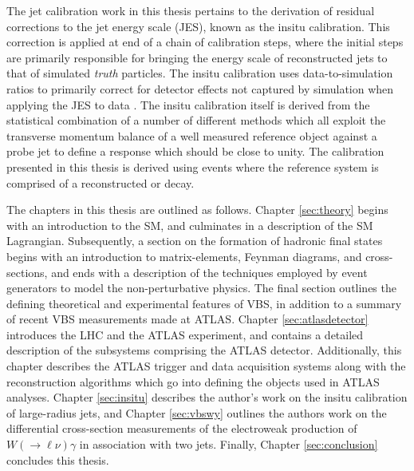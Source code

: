 The jet calibration work in this thesis pertains to the derivation of residual corrections to the jet energy scale (JES), known as the insitu calibration. This correction is applied at end of a chain of calibration steps, where the initial steps are primarily responsible for bringing the energy scale of reconstructed jets to that of simulated \textit{truth} particles. The insitu calibration uses data-to-simulation ratios to primarily correct for detector effects not captured by simulation when applying the JES to data \cite{Atlas:largercali}. The insitu calibration itself is derived from the statistical combination of a number of different methods which all exploit the transverse momentum balance of a well measured reference object against a probe jet to define a response which should be close to unity. The calibration presented in this thesis is derived using events where the reference system is comprised of a reconstructed \zee or \zmm decay.

The chapters in this thesis are outlined as follows. Chapter \ref{sec:theory} begins with an introduction to the SM, and culminates in a description of the SM Lagrangian. Subsequently, a section on the formation of hadronic final states begins with an introduction to matrix-elements, Feynman diagrams, and cross-sections, and ends with a description of the techniques employed by event generators to model the non-perturbative physics. The final section outlines the defining theoretical and experimental features of VBS, in addition to a summary of recent VBS measurements made at ATLAS. Chapter \ref{sec:atlasdetector} introduces the LHC and the ATLAS experiment, and contains a detailed description of the subsystems comprising the ATLAS detector. Additionally, this chapter describes the ATLAS trigger and data acquisition systems along with the reconstruction algorithms which go into defining the objects used in ATLAS analyses. Chapter \ref{sec:insitu} describes the author's work on the insitu calibration of large-radius jets, and Chapter \ref{sec:vbswy} outlines the authors work on the differential cross-section measurements of the electroweak production of $W(\rightarrow\ell\nu)\gamma$ in association with two jets. Finally, Chapter \ref{sec:conclusion} concludes this thesis.

